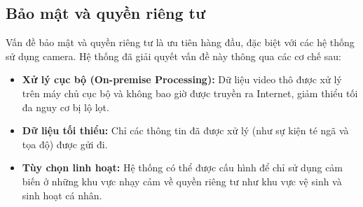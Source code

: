 \subsection{Bảo mật và quyền riêng tư}
Vấn đề bảo mật và quyền riêng tư là ưu tiên hàng đầu, đặc biệt với các hệ thống sử dụng camera. Hệ thống đã giải quyết vấn đề này thông qua các cơ chế sau:
\begin{itemize}
    \item \textbf{Xử lý cục bộ (On-premise Processing):} Dữ liệu video thô được xử lý trên máy chủ cục bộ và không bao giờ được truyền ra Internet, giảm thiểu tối đa nguy cơ bị lộ lọt.
    \item \textbf{Dữ liệu tối thiểu:} Chỉ các thông tin đã được xử lý (như sự kiện té ngã và tọa độ) được gửi đi.
    \item \textbf{Tùy chọn linh hoạt:} Hệ thống có thể được cấu hình để chỉ sử dụng cảm biến ở những khu vực nhạy cảm về quyền riêng tư như khu vực vệ sinh và sinh hoạt cá nhân.
\end{itemize}
